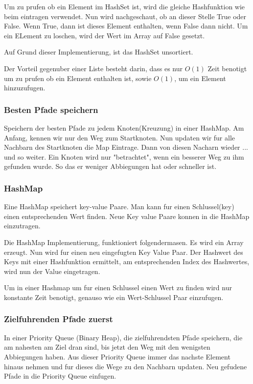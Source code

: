 \documentclass[a4paper,12pt,arial]{scrartcl}
\begin{document}
Um zu prufen ob ein Element im HashSet ist, wird die gleiche Hashfunktion wie beim eintragen verwendet. Nun wird nachgeschaut, ob an dieser Stelle True oder False. Wenn True, dann ist dieses Element enthalten, wenn False dann nicht. Um ein ELement zu loschen, wird der Wert im Array auf False gesetzt.

Auf Grund dieser Implementierung, ist das HashSet unsortiert.

Der Vorteil gegenuber einer Liste besteht darin, dass es nur $O(1)$ Zeit benotigt um zu prufen ob ein Element enthalten ist, sowie $O(1)$, um ein Element hinzuzufugen.

\subsubsection{Besten Pfade speichern}
Speichern der besten Pfade zu jedem Knoten(Kreuzung) in einer HashMap.
Am Anfang, kennen wir nur den Weg zum Startknoten.
Nun updaten wir fur alle Nachbarn des Startknoten die Map Eintrage. Dann von diesen Nacharn wieder ... und so weiter.
Ein Knoten wird nur "betrachtet", wenn ein besserer Weg zu ihm gefunden wurde. So das er weniger Abbiegungen hat oder schneller ist.
\subsubsection{HashMap}
Eine HashMap speichert key-value Paare.
Man kann fur einen Schlussel(key) einen entsprechenden Wert finden.
Neue Key value Paare konnen in die HashMap einzutragen.

Die HashMap Implementierung, funktioniert folgendermasen. Es wird ein Array erzeugt.
Nun wird fur einen neu eingefugten Key Value Paar. Der Hashwert des Keys mit einer Hashfunktion ermittelt, am entsprechenden Index des Hashwertes, wird nun der Value eingetragen.

Um in einer Hashmap um fur einen Schlussel einen Wert zu finden wird nur konstante Zeit benotigt, genauso wie ein Wert-Schlussel Paar einzufugen.


\subsubsection{Zielfuhrenden Pfade zuerst}
In einer Priority Queue (Binary Heap), die zielfuhrendsten Pfade speichern, die am nahesten am Ziel dran sind, bis jetzt den Weg mit den wenigsten Abbiegungen haben.
Aus dieser Priority Queue immer das nachste Element hinaus nehmen und fur dieses die Wege zu den Nachbarn updaten. Neu gefudene Pfade in die Priority Queue einfugen.
\end{document}
